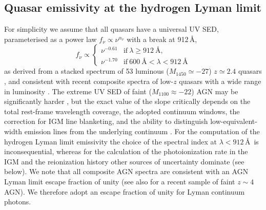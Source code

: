 \documentclass[fleqn,usenatbib]{mnras}
\begin{document}
\subsection{Quasar emissivity at the hydrogen Lyman limit}
\label{sec:e912}

For simplicity we assume that all quasars have a universal UV SED,
parameterised as a power law $f_\nu\propto\nu^{\alpha_\nu}$
with a break at 912\,\AA,
\begin{equation}
  f_\nu\propto\begin{cases}
  \nu^{-0.61} & \text{if}~\lambda\ge 912~\text{\AA},\\
  \nu^{-1.70} & \text{if}~600~\text{\AA}<\lambda<912~\text{\AA}                
  \end{cases}
  \label{eqn:sed}
\end{equation}
as derived from a stacked spectrum of 53 luminous ($M_{1450}\simeq
-27$) $z\simeq 2.4$ quasars \citep{2015MNRAS.449.4204L}, and
consistent with recent composite spectra of low-$z$ quasars with a
wide range in luminosity \citep{2012ApJ...752..162S,
  2014ApJ...794...75S}.  The extreme UV SED of faint ($M_{1100}\approx
-22$) AGN may be significantly harder
\citep[$\alpha_\nu=-0.56$,][]{2004ApJ...615..135S}, but the exact
value of the slope critically depends on the total rest-frame
wavelength coverage, the adopted continuum windows, the correction for
IGM line blanketing, and the ability to distinguish
low-equivalent-width emission lines from the underlying continuum
\citep{2014ApJ...794...75S,2015MNRAS.449.4204L,2016ApJ...817...56T}.
For the computation of the hydrogen Lyman limit emissivity the choice
of the spectral index at $\lambda<912$\,\AA\ is inconsequential,
whereas for the calculation of the  photoionization rate in
the IGM and the  reionization history other sources of
uncertainty dominate (see below). We note that all composite AGN
spectra are consistent with an AGN Lyman limit escape fraction of
unity (see also \citealt{2018A&A...613A..44G} for a recent sample of
faint $z\sim 4$ AGN).  We therefore adopt an escape fraction of unity
for Lyman continuum photons.
\end{document}
